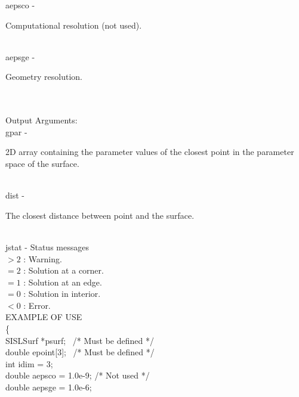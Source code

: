         \>\>    {\fov aepsco}\> - \>  \begin{minipg2}
                     Computational resolution (not used).
                               \end{minipg2}\\
        \>\>    {\fov aepsge}\> - \>  \begin{minipg2}
                     Geometry resolution.
                               \end{minipg2}\\
\\
        \>Output Arguments:\\
        \>\>    {\fov gpar}\> - \>  \begin{minipg2}
                     2D array containing the parameter values of the
                       closest point in the parameter space
                       of the surface.
                               \end{minipg2}\\
        \>\>    {\fov dist}\> - \>  \begin{minipg2}
                     The closest distance between point and the surface.
                               \end{minipg2}\\
        \>\>    {\fov jstat}     \> - \> Status messages\\
                \>\>\>\>              $> 2$ \> : Warning.\\
                \>\>\>\>              $= 2$ \> : Solution at a corner.\\
                \>\>\>\>              $= 1$ \> : Solution at an edge.\\
                \>\>\>\>              $= 0$ \> : Solution in interior.\\
                \>\>\>\>              $< 0$ \> : Error.\\
\newpagetabs
EXAMPLE OF USE\\
        \>      \{ \\
        \>\>    SISLSurf  \>  *{\fov psurf}; \, /* Must be defined */\\
        \>\>    double    \>  {\fov epoint}[3]; \, /* Must be defined */\\
        \>\>    int       \>  {\fov idim} = 3;\\
        \>\>    double    \>  {\fov aepsco} = 1.0e-9; /* Not used */\\
        \>\>    double    \>  {\fov aepsge} = 1.0e-6;\\

